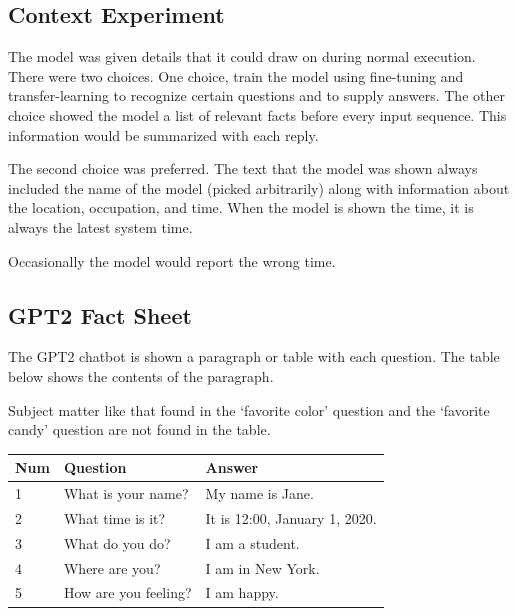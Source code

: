 \subsection{Context Experiment}
The model was given details that it could draw on during normal execution. 
There were two choices. One choice, train the model using fine-tuning and transfer-learning to recognize certain questions and to supply answers. The other choice showed the model a list of relevant facts before every input sequence. This information would be summarized with each reply.

The second choice was preferred. The text that the model was shown always included the name of the model (picked arbitrarily) along with information about the location, occupation, and time. When the model is shown the time, it is always the latest system time.

Occasionally the model would report the wrong time. %

\subsection{GPT2 Fact Sheet}

The GPT2 chatbot is shown a paragraph or table with each question. The table below shows the contents of the paragraph. 


Subject matter like that found in the `favorite color' question and the `favorite candy' question are not found in the table.

\begin{table}[h]
	\begin{center}	
		
		\begin{tabular}{lll}
			Num & Question             & Answer                        \\
			\hline \hline
			1   & What is your name?   & My name is Jane.              \\
			2   & What time is it?     & It is 12:00, January 1, 2020. \\
			3   & What do you do?      & I am a student.               \\
			4   & Where are you?       & I am in New York.             \\
			5   & How are you feeling? & I am happy.                  \\
			\hline     
		\end{tabular}
	\end{center}
	\label{fig-fact-sheet}
	
\end{table}


